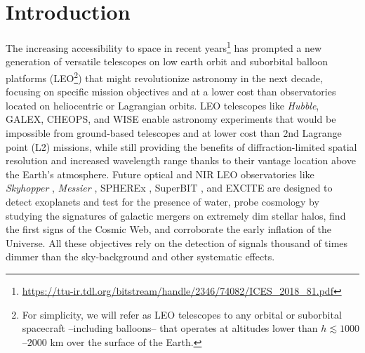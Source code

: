 \documentclass[usenames,dvipsnames,modern]{CLASS_FILES/aastex631}  %
\begin{document}
\section{Introduction}
\label{Sec:introduction}
The increasing accessibility to space in recent years\footnote{\url{https://ttu-ir.tdl.org/bitstream/handle/2346/74082/ICES_2018_81.pdf}} has prompted  a new generation of versatile telescopes on low earth orbit and suborbital balloon platforms (LEO\footnote{For simplicity, we will refer as LEO telescopes to any orbital or suborbital spacecraft --including balloons-- that operates at altitudes lower than $h\lesssim1000$--$2000$ km over the surface of the Earth.}) that might revolutionize astronomy in the next decade, focusing on specific mission objectives and at a lower cost than observatories located on heliocentric or Lagrangian orbits. LEO telescopes like \emph{Hubble}, GALEX, CHEOPS, and WISE enable astronomy experiments that would be impossible from ground-based telescopes and at lower cost than 2nd Lagrange point (L2) missions, while still providing the benefits of diffraction-limited spatial resolution and increased wavelength range thanks to their vantage location above the Earth's atmosphere. Future optical and NIR LEO observatories like \emph{Skyhopper} \citep{mearns+2018arxiv1808.06746}, \emph{Messier} \citep{vallsgabaud+2017inproceedings_199}, SPHEREx \citep{bock+2018inproceedings_354}, SuperBIT \citep{pascale+2021inproceedings_EPSC2021}, and EXCITE \citep{li+2021inproceedings_132} are designed to detect exoplanets and test for the presence of water, probe cosmology by studying the signatures of galactic mergers on extremely dim stellar halos, find the first signs of the Cosmic Web, and corroborate the early inflation of the Universe. All these objectives rely on the detection of signals thousand of times dimmer than the sky-background and other systematic effects.\\


\end{document}
